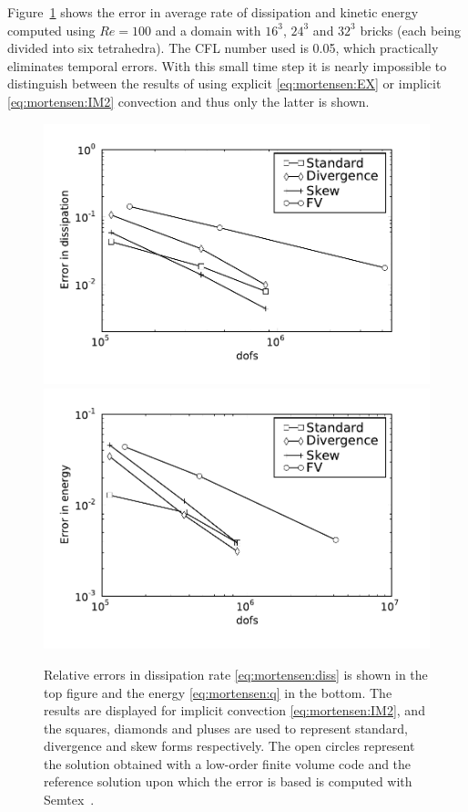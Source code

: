 Figure~\ref{fig:mortensen:dissipation} shows the error in average
rate of dissipation and kinetic energy computed using $Re=100$ and
a  domain with $16^3$, $24^3$ and $32^3$ bricks (each
being divided into six tetrahedra). The CFL number used is 0.05, which
practically eliminates temporal errors. With this small time step it is
nearly impossible to distinguish between the results of using explicit
\eqref{eq:mortensen:EX} or implicit \eqref{eq:mortensen:IM2} convection
and thus only the latter is shown.
\begin{figure}
  \centering
  \includegraphics[width=\twofigs]{chapters/mortensen/pdf/TG_disserror_model_0_cfl_0_05_Re_100_dofs.pdf}
  \includegraphics[width=\twofigs]{chapters/mortensen/pdf/TG_energyerror_model_0_cfl_0_05_Re_100_dofs.pdf}
  \caption{Relative errors in dissipation rate \eqref{eq:mortensen:diss} is
    shown in the top figure and the energy \eqref{eq:mortensen:q} in the bottom. The
    results are displayed for implicit convection
    \eqref{eq:mortensen:IM2}, and the squares, diamonds and pluses
    are used to represent standard, divergence and skew forms
    respectively. The open circles represent the solution obtained
    with a low-order finite volume code and the reference solution
    upon which the error is based is computed with
    Semtex~\citep{Blackburn2009}. }
  \label{fig:mortensen:dissipation}
\end{figure}
